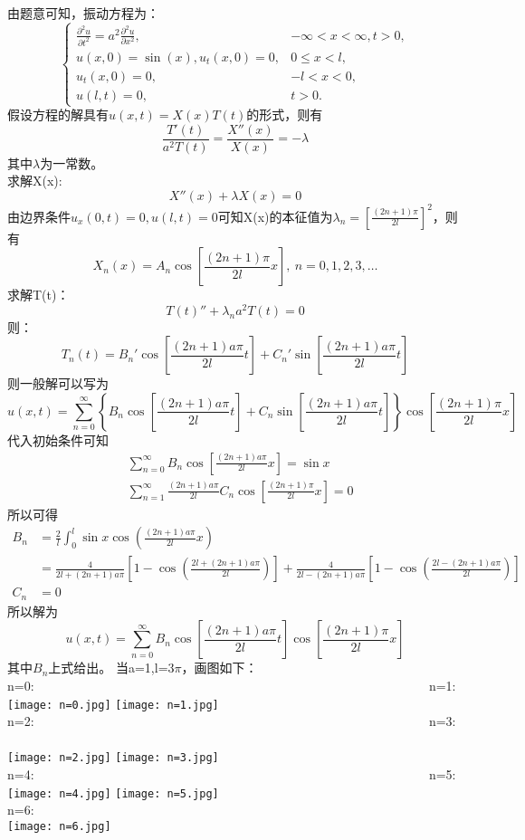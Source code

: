 \documentclass[10.5pt]{article}
\begin{document}
由题意可知，振动方程为：$$\begin{cases}
    \frac{\partial^2u}{\partial t^2}=a^2\frac{\partial^2u}{\partial x^2},& -\infty<x<\infty,t>0,\\
    u(x,0)=\sin(x),u_t(x,0)=0,& 0\leqslant x<l,\\
    u_t(x,0)=0,& -l<x<0,\\
    u(l,t)=0,&t>0.
\end{cases}$$\indent
假设方程的解具有$u(x,t)=X(x)T(t)$的形式，则有$$\frac{T'(t)}{a^2T(t)}=\frac{X''(x)}{X(x)}=-\lambda$$\indent
其中$\lambda$为一常数。\\\indent
求解X(x):$$X''(x)+\lambda X(x)=0$$\indent
由边界条件$u_{x}(0,t)=0,u(l,t)=0$可知X(x)的本征值为$\lambda_n=\left[\frac{(2n+1)\pi}{2l}\right]^2$，则有$$X_n(x)=A_n\cos\left[\frac{(2n+1)\pi}{2l}x\right],~n=0,1,2,3,\dots$$\indent
求解T(t)：$$T(t)''+\lambda_n a^2T(t)=0$$\indent
则：$$T_n(t)=B_n'\cos\left[\frac{(2n+1)a\pi}{2l}t\right]+C_n'\sin\left[\frac{(2n+1)a\pi}{2l}t\right]$$\indent
则一般解可以写为$$u(x,t)=\sum_{n=0}^{\infty}\left\{B_n\cos\left[\frac{(2n+1)a\pi}{2l}t\right]+C_n\sin\left[\frac{(2n+1)a\pi}{2l}t\right]\right\}\cos\left[\frac{(2n+1)\pi}{2l}x\right]$$\indent
代入初始条件可知$$\begin{aligned}
    &\sum_{n=0}^{\infty}B_n\cos\left[\frac{(2n+1)a\pi}{2l}x\right]=\sin x\\
    &\sum_{n=1}^{\infty}\frac{(2n+1)a\pi}{2l}C_n\cos\left[\frac{(2n+1)\pi}{2l}x\right]=0
\end{aligned}$$\indent
所以可得$$\begin{aligned}
    B_n&=\frac{2}{l}\int_0^l\sin x\cos\left(\frac{(2n+1)a\pi}{2l}x\right)\\
    &=\frac{4}{2l+(2n+1)a\pi}\left[1-\cos\left(\frac{2l+(2n+1)a\pi}{2l}\right)\right]+\frac{4}{2l-(2n+1)a\pi}\left[1-\cos\left(\frac{2l-(2n+1)a\pi}{2l}\right)\right]\\
    C_n&=0
\end{aligned}$$\indent
所以解为$$u(x,t)=\sum_{n=0}^{\infty}B_n\cos\left[\frac{(2n+1)a\pi}{2l}t\right]\cos\left[\frac{(2n+1)\pi}{2l}x\right]$$\indent
其中$B_n$上式给出。
当a=1,l=3$\pi$，画图如下：\\\indent
n=0: ~~~~~~~~~~~~~~~~~~~~~~~~~~~~~~~~~~~~~~~ ~~~~~~~~~~~~~~~~~~~~~~n=1:\\
\texttt{[image: n=0.jpg]}
\texttt{[image: n=1.jpg]}\\\indent
n=2: ~~~~~~~~~~~~~~~~~~~~~~~~~~~~~~~~~~~~~~~ ~~~~~~~~~~~~~~~~~~~~~~n=3:\\\\
\texttt{[image: n=2.jpg]}
\texttt{[image: n=3.jpg]}\\\indent
n=4: ~~~~~~~~~~~~~~~~~~~~~~~~~~~~~~~~~~~~~~~ ~~~~~~~~~~~~~~~~~~~~~~n=5:\\
\texttt{[image: n=4.jpg]}
\texttt{[image: n=5.jpg]}\\\indent
n=6:\\
\texttt{[image: n=6.jpg]}
\end{document}
